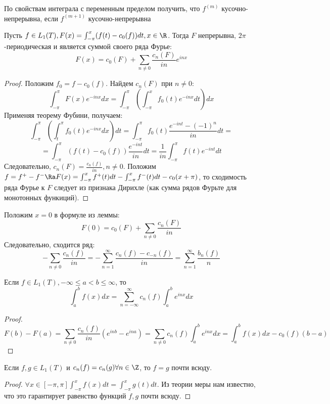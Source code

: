 \begin{exercise}
    По свойствам интеграла с переменным пределом получить, что \(f^{(m)}\) кусочно-непрерывна, если \(f^{(m + 1)}\) кусочно-непрерывна
\end{exercise}


\begin{lemma}
    Пусть \(f \in L_1(T), F(x) = \int_{-\pi}^x (f(t) - c_0(f))dt, x \in \R\). Тогда \(F\) непрерывна, \(2\pi\)-периодическая и является суммой своего ряда Фурье:
    \[F(x) = c_0(F) + \sum_{n \ne 0} \frac{c_n(F)}{in}e^{inx}\]
\end{lemma}
\begin{proof}
    Положим \(f_0 = f - c_0(f)\). Найдем \(c_n(F)\) при \(n \ne 0\):
    \[\int_{-\pi}^\pi F(x)e^{-inx}dx = \int_{-\pi}^\pi\left( \int_{-\pi}^x f_0(t)e^{-inx} dt\right)dx\]
    Применяя теорему Фубини, получаем:
    \[\int_{-\pi}^\pi\left( \int_{t}^\pi f_0(t)e^{-inx} dx\right)dt = \int_{-\pi}^\pi f_0(t) \frac{e^{-int} - (-1)^n}{in}dt =\]
    \[= \int_{-\pi}^\pi(f(t) - c_0(f))\frac{e^{-int}}{in}dt = \frac{1}{in}\int_{-\pi}^\pi f(t)e^{-int}dt\]
    Следовательно, \(c_n(F) = \frac{c_n(f)}{in}, n \ne 0\). Положим \(f = f^+ - f^- \Ra F(x) = \int_{-\pi}^x f^+(t)dt - \int_{-\pi}^x f^-(t)dt - c_0(x + \pi)\), то сходимость ряда Фурье к \(F\) следует из признака Дирихле (как сумма рядов Фурьте для монотонных функиций).
\end{proof}

\begin{note}
    Положим \(x = 0\) в формуле из леммы:
    \[F(0) = c_0(F) + \sum_{n \ne 0} \frac{c_n(F)}{in}\]
    Следовательно, сходится ряд:
    \[-\sum_{n \ne 0}\frac{c_n(f)}{in} = -\sum_{n = 1}^\infty \frac{c_n(f) - c_{-n}(f)}{in} = \sum_{n = 1}^\infty \frac{b_n(f)}{n}\]
\end{note}

\begin{theorem}
    Если \(f \in L_1(T), -\infty \le a < b \le \infty\), то
    \[\int_a^b f(x)dx = \sum_{n = -\infty}^\infty c_n(f)\int_a^be^{inx}dx\]
\end{theorem}
\begin{proof}
    \[F(b) - F(a) = \sum_{n \ne 0} \frac{c_n(f)}{in}(e^{inb} - e^{ina}) = \sum_{n \ne 0} c_n(f) \int_a^be^{inx}dx = \int_a^b f(x)dx - c_0(f)(b - a)\]
\end{proof}

\begin{corollary}
    Если \(f, g \in L_1(T)\) и \(c_n(f) = c_n(g) \forall n \in \Z\), то \(f = g\) почти всюду.
\end{corollary}
\begin{proof}
    \(\forall x \in [-\pi, \pi] \int_{-\pi}^x f(x) dt = \int_{-\pi}^x g(t) dt\). Из теории меры нам известно, что это гарантирует равенство функций \(f, g\) почти всюду.
\end{proof}

